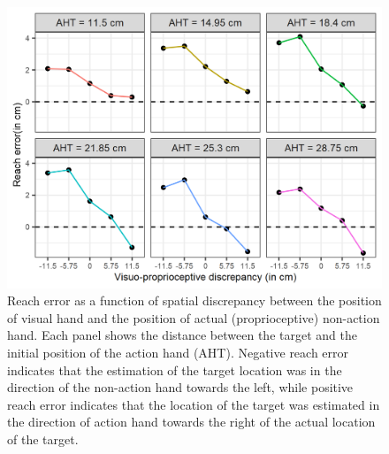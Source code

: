 \begin{figure}[t]
\centering       
    \includegraphics[scale=1]{Images/exp2_results2.png}
    \caption{Reach error as a function of spatial discrepancy between the position of visual hand and the position of actual (proprioceptive) non-action hand. Each panel shows the distance between the target and the initial position of the action hand (AHT). Negative reach error indicates that the estimation of the target location was in the direction of the non-action hand towards the left, while positive reach error indicates that the location of the target was estimated in the direction of action hand towards the right of the actual location of the target.}
    \label{fig:exp2_re-aht}
\end{figure}